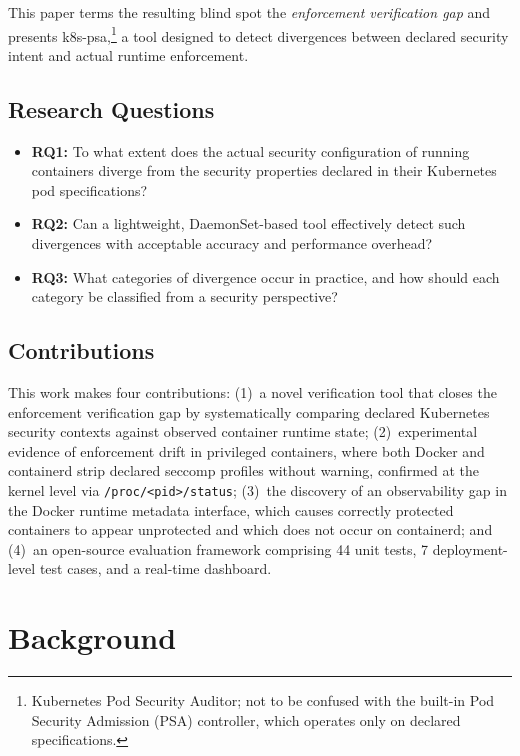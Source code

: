 \documentclass[sigconf]{acmart}
\begin{document}
This paper terms the resulting blind spot the \emph{enforcement verification gap} and presents k8s-psa,\footnote{Kubernetes Pod Security Auditor; not to be confused with the built-in Pod Security Admission (PSA) controller, which operates only on declared specifications.} a tool designed to detect divergences between declared security intent and actual runtime enforcement.

\subsection{Research Questions}

\begin{itemize}
    \item \textbf{RQ1:} To what extent does the actual security configuration of running containers diverge from the security properties declared in their Kubernetes pod specifications?
    \item \textbf{RQ2:} Can a lightweight, DaemonSet-based tool effectively detect such divergences with acceptable accuracy and performance overhead?
    \item \textbf{RQ3:} What categories of divergence occur in practice, and how should each category be classified from a security perspective?
\end{itemize}

\subsection{Contributions}

This work makes four contributions: (1)~a novel verification tool that closes the enforcement verification gap by systematically comparing declared Kubernetes security contexts against observed container runtime state; (2)~experimental evidence of enforcement drift in privileged containers, where both Docker and containerd strip declared seccomp profiles without warning, confirmed at the kernel level via \texttt{/proc/<pid>/status}; (3)~the discovery of an observability gap in the Docker runtime metadata interface, which causes correctly protected containers to appear unprotected and which does not occur on containerd; and (4)~an open-source evaluation framework comprising 44 unit tests, 7 deployment-level test cases, and a real-time dashboard.

\section{Background}
\end{document}
